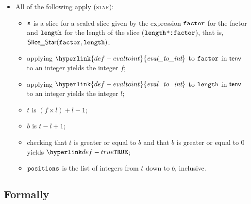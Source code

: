 \documentclass{book}
\newcommand\ProseOrTypeError[0]{\ProseTerminateAs{\TypeErrorConfig}}
\newcommand\evaltoint[0]{\hyperlink{def-evaltoint}{\textfunc{eval\_to\_int}}}
\begin{document}
\begin{itemize}
  \item All of the following apply (\textsc{star}):
  \begin{itemize}
    \item $\texttt{s}$ is a slice for a scaled slice given by the expression $\texttt{factor}$
          for the factor and $\texttt{length}$ for the length of the slice (\texttt{$\texttt{length}$*:$\texttt{factor}$}),
          that is, \\ $\textsf{Slice\_Star}(\texttt{factor}, \texttt{length})$;
    \item applying $\evaltoint$ to $\texttt{factor}$ in $\textsf{tenv}$ to an integer yields the integer $f$\ProseOrTypeError;
    \item applying $\evaltoint$ to $\texttt{length}$ in $\textsf{tenv}$ to an integer yields the integer $l$\ProseOrTypeError;
    \item $t$ is $(f \times l) + l - 1$;
    \item $b$ is $t - l + 1$;
    \item checking that $t$ is greater or equal to $b$ and that $b$ is greater or equal to $0$ yields $\True$\ProseOrTypeError;
    \item $\texttt{positions}$ is the list of integers from $t$ down to $b$, inclusive.
  \end{itemize}
\end{itemize}

\subsection{Formally}
\end{document}
